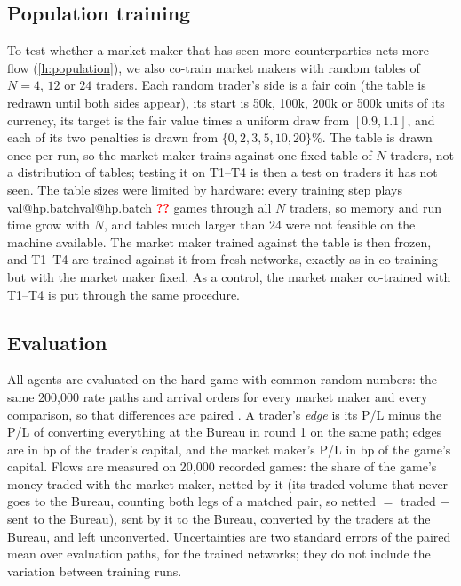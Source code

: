 \documentclass[11pt,a4paper]{article}
\makeatletter
\theoremstyle{plain}
\theoremstyle{definition}
\newcommand{\val}[1]{\ifcsname val@#1\endcsname\csname val@#1\endcsname\else
  \textcolor{red}{\textbf{??\detokenize{#1}}}\PackageWarning{paper}{Missing value #1}\fi}
\newcommand{\1}{\mathbf{1}}
\makeatother
\begin{document}
\subsection{Population training}\label{sec:population-method}
To test whether a market maker that has seen more counterparties nets more flow (\cref{h:population}), we also co-train market makers with random tables of $N=4$, $12$ or $24$ traders. Each random trader's side is a fair coin (the table is redrawn until both sides appear), its start is 50k, 100k, 200k or 500k units of its currency, its target is the fair value times a uniform draw from $[0.9,1.1]$, and each of its two penalties is drawn from $\{0,2,3,5,10,20\}\%$. The table is drawn once per run, so the market maker trains against one fixed table of $N$ traders, not a distribution of tables; testing it on T1--T4 is then a test on traders it has not seen. The table sizes were limited by hardware: every training step plays \val{hp.batch} games through all $N$ traders, so memory and run time grow with $N$, and tables much larger than 24 were not feasible on the machine available. The market maker trained against the table is then frozen, and T1--T4 are trained against it from fresh networks, exactly as in co-training but with the market maker fixed. As a control, the market maker co-trained with T1--T4 is put through the same procedure.

\subsection{Evaluation}\label{sec:eval}
All agents are evaluated on the hard game with common random numbers: the same 200{,}000 rate paths and arrival orders for every market maker and every comparison, so that differences are paired \citep{glasserman2004}. A trader's \emph{edge} is its P/L minus the P/L of converting everything at the Bureau in round 1 on the same path; edges are in bp of the trader's capital, and the market maker's P/L in bp of the game's capital. Flows are measured on 20{,}000 recorded games: the share of the game's money traded with the market maker, netted by it (its traded volume that never goes to the Bureau, counting both legs of a matched pair, so netted $=$ traded $-$ sent to the Bureau), sent by it to the Bureau, converted by the traders at the Bureau, and left unconverted. Uncertainties are two standard errors of the paired mean over evaluation paths, for the trained networks; they do not include the variation between training runs.
\end{document}
